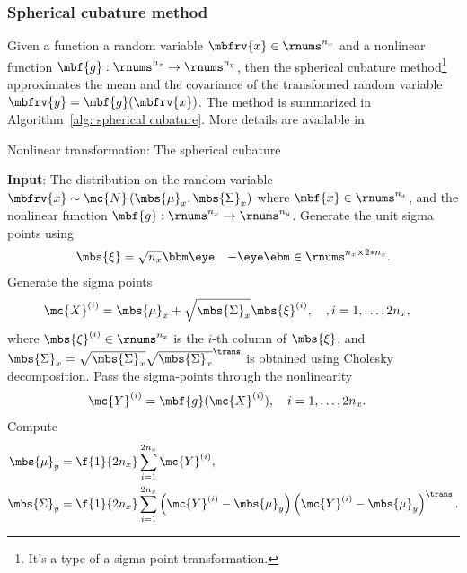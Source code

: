 \subsubsection{Spherical cubature method}
Given a function a random variable $\mbfrv{x}\in\rnums^{n_{x}}$ and a nonlinear function $\mbf{g}:\rnums^{n_{x}}\to\rnums^{n_{y}}$, then the spherical cubature method\footnote{It's a type of a sigma-point transformation.} approximates the mean and the covariance of the transformed random variable $\mbfrv{y}=\mbf{g}(\mbfrv{x})$. The method is summarized in Algorithm~\ref{alg: spherical cubature}. More details are available in \cite[Algorithm~6.8]{sarkka_bayesian_2013}


\begin{algorithm}[H]
    \caption{Nonlinear transformation: The spherical cubature}
    \label{alg: spherical cubature}
    \begin{algorithmic}[1]
        \State \textbf{Input}: The distribution on the random variable $\mbfrv{x}\sim\mc{N}\left( \mbs{\mu}_{x},\mbs{\Sigma}_{x} \right)$ where $\mbf{x}\in\rnums^{n_{x}}$, and the nonlinear function $\mbf{g}:\rnums^{n_{x}}\to\rnums^{n_{y}}$.
        \State Generate the unit sigma points using
        \begin{align}
            \mbs{\xi} &= \sqrt{n_{x}} \bbm \eye&-\eye \ebm\in\rnums^{n_{x} \times 2*n_{x}}.
        \end{align}
        \State Generate the sigma points
        \begin{align}
            \mc{X}^{(i)} &= \mbs{\mu}_{x} + \sqrt{\mbs{\Sigma}_{x}}\mbs{\xi}^{(i)}, \quad, i=1,\ldots, 2n_{x},
        \end{align}
        where $\mbs{\xi}^{(i)}\in\rnums^{n_{x}}$ is the $i$-th column of $\mbs{\xi}$, and $\mbs{\Sigma}_{x} = \sqrt{\mbs{\Sigma}_{x}}\sqrt{\mbs{\Sigma}_{x}}^{\trans}$ is obtained using Cholesky decomposition.
        \State Pass the sigma-points through the nonlinearity
        \begin{align}
            \mc{Y}^{(i)} &= \mbf{g}(\mc{X}^{(i)}), \quad i=1, \ldots, 2n_{x}.
        \end{align}
        \State Compute
        \begin{align}
            \mbs{\mu}_{y} &= \f{1}{2n_{x}}\sum_{i=1}^{2n_{x}}\mc{Y}^{(i)},\\
            \mbs{\Sigma}_{y} &= \f{1}{2n_{x}}\sum_{i=1}^{2n_{x}}\left( \mc{Y}^{(i)}-\mbs{\mu}_{y} \right)\left( \mc{Y}^{(i)}-\mbs{\mu}_{y} \right)^{\trans}.
        \end{align}
    \end{algorithmic}
\end{algorithm}

